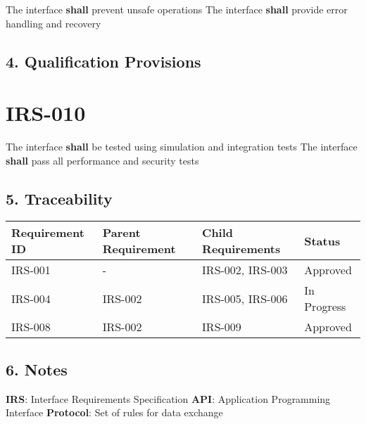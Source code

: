 The interface \textbf{shall} prevent unsafe operations
The interface \textbf{shall} provide error handling and recovery

\subsection{4. Qualification Provisions}

\section{IRS-010}\label{IRS-010}

The interface \textbf{shall} be tested using simulation and integration tests
The interface \textbf{shall} pass all performance and security tests

\subsection{5. Traceability}

\begin{longtable}{|l|l|l|l|}
 Requirement ID & Parent Requirement & Child Requirements & Status \\
\hline
 IRS-001 & - & IRS-002, IRS-003 & Approved \\
 IRS-004 & IRS-002 & IRS-005, IRS-006 & In Progress \\
 IRS-008 & IRS-002 & IRS-009 & Approved \\
\end{longtable}

\subsection{6. Notes}
\textbf{IRS}: Interface Requirements Specification
\textbf{API}: Application Programming Interface
\textbf{Protocol}: Set of rules for data exchange

